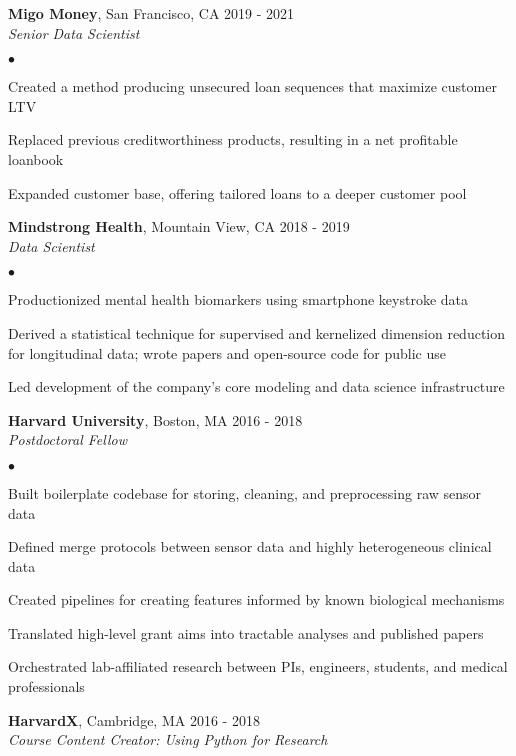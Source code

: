 \documentclass[margin,line]{res}
\newenvironment{bulletlist}{
  \begin{list}{$\bullet$}{%
      \setlength{\itemsep}{0in}
      \setlength{\parsep}{0in}
      \setlength{\parskip}{0in}
      \setlength{\topsep}{0in}
      \setlength{\partopsep}{0in}
      \setlength{\leftmargin}{0.15in}
      \setlength{\labelwidth}{0.05in}
      \setlength{\labelsep}{0.1in}
      \setlength{\itemindent}{0in}
      \setlength{\rightmargin}{0in}}}
  {\end{list}}
\begin{document}
\begin{resume}
{\bf Migo Money}, San Francisco, CA \hfill{2019 - 2021 }\\
\textit{Senior Data Scientist} \\[-.35cm]
\begin{bulletlist}
\item Created a method producing unsecured loan sequences that maximize customer LTV
\item Replaced previous creditworthiness products, resulting in a net profitable loanbook
\item Expanded customer base, offering tailored loans to a deeper customer pool
\end{bulletlist}
\vspace{-0.1cm}

{\bf Mindstrong Health}, Mountain View, CA \hfill {2018 - 2019}\\
\textit{Data Scientist} \\[-.35cm]
\begin{bulletlist}
\item Productionized mental health biomarkers using smartphone keystroke data
\item Derived a statistical technique for supervised and kernelized dimension reduction for longitudinal data; wrote papers and open-source code for public use
\item Led development of the company's core modeling and data science infrastructure
\end{bulletlist}

{\bf Harvard University}, Boston, MA  \hfill 2016 - 2018\\
\textit{Postdoctoral Fellow} \\[-.35cm]
\begin{bulletlist}
\item Built boilerplate codebase for storing, cleaning, and preprocessing raw sensor data
\item Defined merge protocols between sensor data and highly heterogeneous clinical data
\item Created pipelines for creating features informed by known biological mechanisms
\item Translated high-level grant aims into tractable analyses and published papers
\item Orchestrated lab-affiliated research between PIs, engineers, students, and medical professionals
\end{bulletlist}

{\bf HarvardX}, Cambridge, MA  \hfill 2016 - 2018\\
\textit{Course Content Creator: Using Python for Research}


\end{resume}
\end{document}
